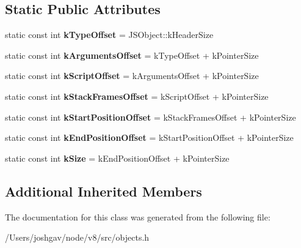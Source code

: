 \subsection*{Static Public Attributes}
\begin{DoxyCompactItemize}
\item 
static const int {\bfseries k\+Type\+Offset} = J\+S\+Object\+::k\+Header\+Size\hypertarget{classv8_1_1internal_1_1_j_s_message_object_abb3ff5762da76ef2233e253060fa1c7f}{}\label{classv8_1_1internal_1_1_j_s_message_object_abb3ff5762da76ef2233e253060fa1c7f}

\item 
static const int {\bfseries k\+Arguments\+Offset} = k\+Type\+Offset + k\+Pointer\+Size\hypertarget{classv8_1_1internal_1_1_j_s_message_object_afbd05eb4a6dc5620913a1f25efdd9f90}{}\label{classv8_1_1internal_1_1_j_s_message_object_afbd05eb4a6dc5620913a1f25efdd9f90}

\item 
static const int {\bfseries k\+Script\+Offset} = k\+Arguments\+Offset + k\+Pointer\+Size\hypertarget{classv8_1_1internal_1_1_j_s_message_object_a56601869f06fd680de6f217db4abf7dc}{}\label{classv8_1_1internal_1_1_j_s_message_object_a56601869f06fd680de6f217db4abf7dc}

\item 
static const int {\bfseries k\+Stack\+Frames\+Offset} = k\+Script\+Offset + k\+Pointer\+Size\hypertarget{classv8_1_1internal_1_1_j_s_message_object_ab52f9e48cf5e1bc47d7a05f7448f9593}{}\label{classv8_1_1internal_1_1_j_s_message_object_ab52f9e48cf5e1bc47d7a05f7448f9593}

\item 
static const int {\bfseries k\+Start\+Position\+Offset} = k\+Stack\+Frames\+Offset + k\+Pointer\+Size\hypertarget{classv8_1_1internal_1_1_j_s_message_object_a823062d07d7010b29e0cf03af96d12f5}{}\label{classv8_1_1internal_1_1_j_s_message_object_a823062d07d7010b29e0cf03af96d12f5}

\item 
static const int {\bfseries k\+End\+Position\+Offset} = k\+Start\+Position\+Offset + k\+Pointer\+Size\hypertarget{classv8_1_1internal_1_1_j_s_message_object_aa114b54714631cf3068b62e3fee2498f}{}\label{classv8_1_1internal_1_1_j_s_message_object_aa114b54714631cf3068b62e3fee2498f}

\item 
static const int {\bfseries k\+Size} = k\+End\+Position\+Offset + k\+Pointer\+Size\hypertarget{classv8_1_1internal_1_1_j_s_message_object_ab27256e0a1d2d413a2d87163ff29efe3}{}\label{classv8_1_1internal_1_1_j_s_message_object_ab27256e0a1d2d413a2d87163ff29efe3}

\end{DoxyCompactItemize}
\subsection*{Additional Inherited Members}


The documentation for this class was generated from the following file\+:\begin{DoxyCompactItemize}
\item 
/\+Users/joshgav/node/v8/src/objects.\+h\end{DoxyCompactItemize}
